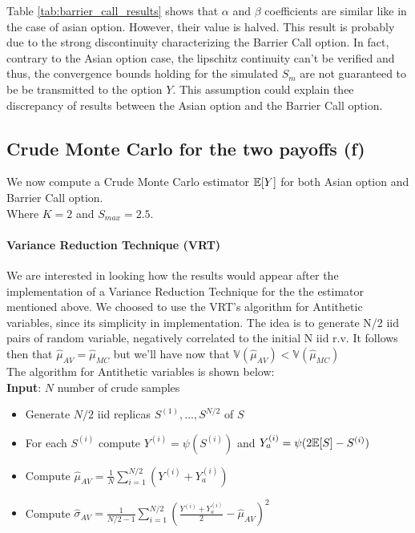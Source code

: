 Table \ref{tab:barrier_call_results} shows that $\alpha$ and $\beta$ coefficients are similar like in the case of asian option. However, their value is halved. This result is probably due to the strong discontinuity characterizing the Barrier Call option. In fact, contrary to the Asian option case, the lipschitz continuity can't be verified and thus, the convergence bounds holding for the simulated $S_m$ are not guaranteed to be be transmitted to the option $Y$. This assumption could explain thee discrepancy of results between the Asian option and the Barrier Call option.

\subsection{Crude Monte Carlo for the two payoffs (f)}
We now compute a Crude Monte Carlo estimator $\mathbb{E}[Y]$ for both Asian option and Barrier Call option.
\\
Where $K = 2$ and $S_{max} = 2.5$.

\paragraph{Variance Reduction Technique (VRT)}
We are interested in looking how the results would appear after the implementation of a Variance Reduction Technique for the the estimator mentioned above. We choosed to use the VRT's algorithm for Antithetic variables, since its simplicity in implementation. The idea is to generate N/2 iid pairs of random variable, negatively correlated to the initial N iid r.v. It follows then that $\hat{\mu}_{AV} = \hat{\mu}_{MC}$ but we'll have now that $\mathbb{V}(\hat{\mu}_{AV}) < \mathbb{V}(\hat{\mu}_{MC})$
\\
The algorithm for Antithetic variables is shown below:
\\
\textbf{Input}: $N$ number of crude samples
\begin{itemize}
    \item Generate $N/2$ iid replicas $S^{(1)}, ... , S^{N/2}$ of $S$
    \item For each $S^{(i)}$ compute $Y^{(i)} = \psi(S^{(i)})$ and $Y^{(i)}_{a} = \psi(2\mathbb{E}[S] - S^{(i)})$
    \item Compute $\hat{\mu}_{AV} = \frac{1}{N} \sum_{i=1}^{N/2}{(Y^{(i)}+Y^{(i)}_{a})}$
    \item Compute $\hat{\sigma}_{AV} = \frac{1}{N/2-1} \sum_{i=1}^{N/2}{(\frac{Y^{(i)}+Y^{(i)}_{a}}{2} -\hat{\mu}_{AV})^{2}}$
\end{itemize}

